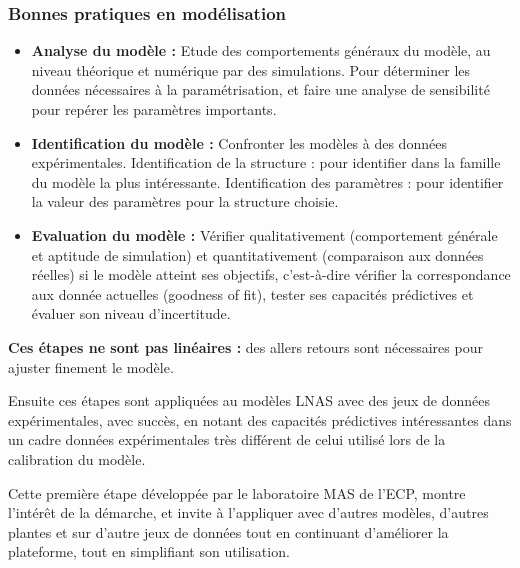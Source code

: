 \subsubsection{Bonnes pratiques en modélisation}

\begin{itemize}

\item \textbf{Analyse du modèle :} Etude des comportements généraux du modèle, au niveau théorique et numérique par des simulations. Pour déterminer les données nécessaires à la paramétrisation, et faire une analyse de sensibilité pour repérer les paramètres importants.
\item \textbf{Identification du modèle :} Confronter les modèles à des données expérimentales. Identification de la structure : pour identifier dans la famille du modèle la plus intéressante. Identification des paramètres : pour identifier la valeur des paramètres pour la structure choisie.
\item \textbf{Evaluation du modèle :} Vérifier qualitativement (comportement générale et aptitude de simulation) et quantitativement (comparaison aux données réelles) si le modèle atteint ses objectifs, c’est-à-dire vérifier la correspondance aux donnée actuelles (goodness of fit), tester ses capacités prédictives et évaluer son niveau d’incertitude.

\end{itemize}

\textbf{Ces étapes ne sont pas linéaires :} des allers retours sont nécessaires pour ajuster finement le modèle.

Ensuite ces étapes sont appliquées au modèles LNAS avec des jeux de données expérimentales, avec succès, en notant des capacités prédictives intéressantes dans un cadre données expérimentales très différent de celui utilisé lors de la calibration du modèle.

Cette première étape développée par le laboratoire MAS de l’ECP, montre l’intérêt de la démarche, et invite à l’appliquer avec d’autres modèles, d’autres plantes et sur d’autre jeux de données tout en continuant d’améliorer la plateforme, tout en simplifiant son utilisation.
